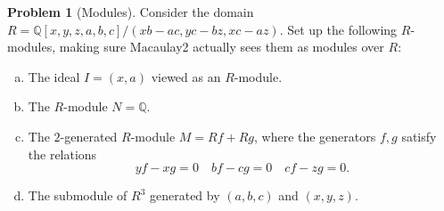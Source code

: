 \documentclass[11pt]{article}
\theoremstyle{definition}
\newtheorem{problem}{Problem}
\begin{document}
\begin{problem}[Modules]
	Consider the domain $R = \mathbb{Q}[x,y,z,a,b,c]/(xb-ac,yc-bz,xc-az)$. Set up the following $R$-modules, making sure Macaulay2 actually sees them as modules over $R$:
	\begin{enumerate}[a)]
		\item The ideal $I = (x,a)$ viewed as an $R$-module.
		\item The $R$-module $N = \mathbb{Q}$.
		\item The $2$-generated $R$-module $M = Rf + Rg$, where the generators $f, g$ satisfy the relations 
		$$yf-xg = 0 \quad bf - cg = 0 \quad cf - zg = 0.$$
		\item The submodule of $R^3$ generated by $(a,b,c)$ and $(x,y,z)$.
	\end{enumerate}
\end{problem}




%
%
%
%
%
%
%
\end{document}
